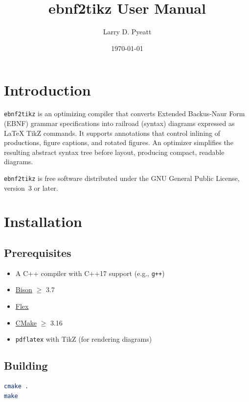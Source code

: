 \documentclass[11pt,letterpaper]{article}
\title{\textbf{ebnf2tikz User Manual}}
\author{Larry D. Pyeatt}
\date{\today}
\newcommand{\prog}{\texttt{ebnf2tikz}}
\begin{document}
\maketitle
\tableofcontents
\newpage

\section{Introduction}

\prog{} is an optimizing compiler that converts Extended Backus-Naur
Form (EBNF) grammar specifications into railroad (syntax) diagrams
expressed as \LaTeX{} TikZ commands.  It supports annotations that
control inlining of productions, figure captions, and rotated figures.
An optimizer simplifies the resulting abstract syntax tree before
layout, producing compact, readable diagrams.

\prog{} is free software distributed under the GNU General Public
License, version~3 or later.

\section{Installation}

\subsection{Prerequisites}

\begin{itemize}
  \item A C++ compiler with C++17 support (e.g., \texttt{g++})
  \item \href{https://www.gnu.org/software/bison/}{Bison} $\geq$ 3.7
  \item \href{https://github.com/westes/flex}{Flex}
  \item \href{https://cmake.org/}{CMake} $\geq$ 3.16
  \item \texttt{pdflatex} with TikZ (for rendering diagrams)
\end{itemize}

\subsection{Building}

\begin{lstlisting}[language=bash]
cmake .
make
\end{lstlisting}
\end{document}
